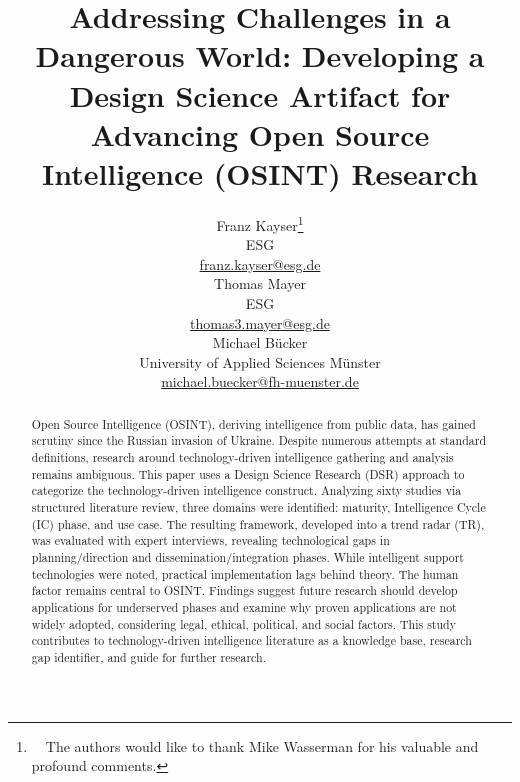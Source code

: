 \documentclass[10pt]{article}
\title{Addressing Challenges in a Dangerous World: Developing a Design Science Artifact for Advancing Open Source Intelligence (OSINT) Research}
\author{Franz Kayser\thanks{~~The authors would like to thank Mike Wasserman for his valuable and profound comments.} \\
 ESG \\
 {\underline{ franz.kayser@esg.de}} \\\And
 Thomas Mayer \\
 ESG  \\
 {\underline{ thomas3.mayer@esg.de} }\\\And 
 Michael Bücker \\
University of Applied Sciences Münster\\
 {\underline{michael.buecker@fh-muenster.de}} \\}
\date{}
\begin{document}
\maketitle
\begin{abstract}
    Open Source Intelligence (OSINT), deriving intelligence from public data, has gained scrutiny since the Russian invasion of Ukraine. Despite numerous attempts at standard definitions, research around technology-driven intelligence gathering and analysis remains ambiguous. This paper uses a Design Science Research (DSR) approach to categorize the technology-driven intelligence construct. Analyzing sixty studies via structured literature review, three domains were identified: maturity, Intelligence Cycle (IC) phase, and use case. The resulting framework, developed into a trend radar (TR), was evaluated with expert interviews, revealing technological gaps in planning/direction and dissemination/integration phases. While intelligent support technologies were noted, practical implementation lags behind theory. The human factor remains central to OSINT. Findings suggest future research should develop applications for underserved phases and examine why proven applications are not widely adopted, considering legal, ethical, political, and social factors. This study contributes to technology-driven intelligence literature as a knowledge base, research gap identifier, and guide for further research.
\end{abstract}
\end{document}
